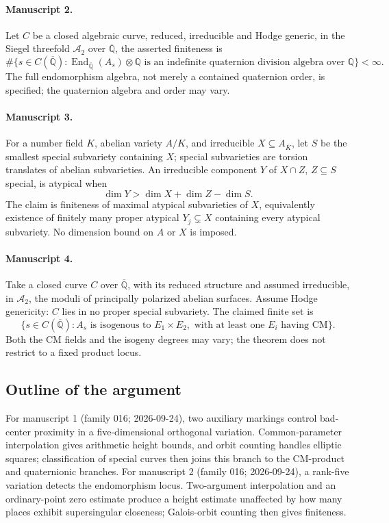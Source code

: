 \documentclass[11pt]{article}
\begin{document}
\paragraph{Manuscript 2.}
Let $C$ be a closed algebraic curve, reduced, irreducible and Hodge generic, in the Siegel threefold $\mathcal A_2$ over $\overline{\mathbb Q}$, the asserted finiteness is
\[
 \#\{s\in C(\overline{\mathbb Q}):
 \operatorname{End}_{\overline{\mathbb Q}}(A_s)\otimes\mathbb Q
 \text{ is an indefinite quaternion division algebra over }\mathbb Q\}<\infty.
\]
The full endomorphism algebra, not merely a contained quaternion order, is specified; the quaternion algebra and order may vary.

\paragraph{Manuscript 3.}
For a number field $K$, abelian variety $A/K$, and irreducible $X\subseteq A_{\bar K}$, let $S$ be the smallest special subvariety containing $X$; special subvarieties are torsion translates of abelian subvarieties. An irreducible component $Y$ of $X\cap Z$, $Z\subseteq S$ special, is atypical when
\[
 \dim Y>\dim X+\dim Z-\dim S.
\]
The claim is finiteness of maximal atypical subvarieties of $X$, equivalently existence of finitely many proper atypical $Y_j\subsetneq X$ containing every atypical subvariety. No dimension bound on $A$ or $X$ is imposed.

\paragraph{Manuscript 4.}
Take a closed curve $C$ over $\overline{\mathbb Q}$, with its reduced structure and assumed irreducible, in $\mathcal A_2$, the moduli of principally polarized abelian surfaces. Assume Hodge genericity: $C$ lies in no proper special subvariety. The claimed finite set is
\[
 \{s\in C(\overline{\mathbb Q}):A_s\text{ is isogenous to }E_1\times E_2,
 \text{ with at least one }E_i\text{ having CM}\}.
\]
Both the CM fields and the isogeny degrees may vary; the theorem does not restrict to a fixed product locus.

\subsection{Outline of the argument}
For manuscript 1 (family 016; 2026-09-24), two auxiliary markings control bad-center proximity in a five-dimensional orthogonal variation. Common-parameter interpolation gives arithmetic height bounds, and orbit counting handles elliptic squares; classification of special curves then joins this branch to the CM-product and quaternionic branches. For manuscript 2 (family 016; 2026-09-24), a rank-five variation detects the endomorphism locus. Two-argument interpolation and an ordinary-point zero estimate produce a height estimate unaffected by how many places exhibit supersingular closeness; Galois-orbit counting then gives finiteness.
\end{document}
